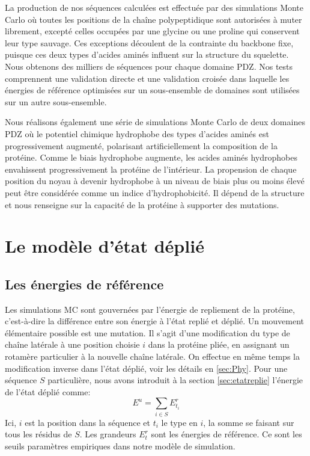 La production de nos séquences calculées est effectuée par des simulations Monte Carlo où toutes les positions de la chaîne polypeptidique sont autorisées à muter librement, excepté celles occupées par une glycine ou une proline qui conservent leur type sauvage. Ces exceptions découlent de la contrainte du backbone fixe, puisque ces deux types d'acides aminés influent sur la structure du squelette. Nous obtenons des milliers de séquences pour chaque domaine PDZ. Nos tests comprennent une validation directe et une validation croisée dans laquelle les énergies de référence optimisées sur un sous-ensemble de domaines sont utilisées sur un autre sous-ensemble.

Nous réalisons également une série de simulations Monte Carlo de deux domaines PDZ où le potentiel chimique hydrophobe des types d'acides aminés est progressivement augmenté, polarisant artificiellement la composition de la protéine. Comme le biais hydrophobe augmente, les acides aminés hydrophobes envahissent progressivement la protéine de l'intérieur. La propension de chaque position du noyau à devenir hydrophobe à un niveau de biais plus ou moins élevé peut être considérée comme un indice d'hydrophobicité. Il dépend de la structure et nous renseigne sur la capacité de la protéine à supporter des mutations.

\section{Le modèle d'état déplié}
\subsection{Les énergies de référence}
\label{sec:enerref}
Les simulations MC sont gouvernées par l'énergie de repliement de la protéine, c'est-à-dire la différence entre
son énergie à l'état replié et déplié. Un mouvement élémentaire possible est une \og mutation\fg. Il s'agit d'une modification du type de chaîne latérale à une position choisie $i$ dans la protéine pliée, en assignant un rotamère particulier à la nouvelle chaîne latérale. On effectue en même temps la modification inverse dans l'état déplié, voir les détails en \ref{sec:Phy}. Pour une séquence $S$ particulière, nous avons introduit à la section \ref{sec:etatreplie} l'énergie de l'état déplié comme:
\begin{equation}
  E^u=\sum_{i\in S}E^r_{t_i}
  \label{eq:ener_unfolded}
\end{equation} 
Ici, $i$ est la position dans la séquence et $t_i$ le type en $i$, la somme se faisant sur tous les résidus de $S$. Les grandeurs $E_t^r$ sont les  \og énergies de référence\fg. Ce sont les seuils paramètres empiriques dans notre modèle de simulation. 

